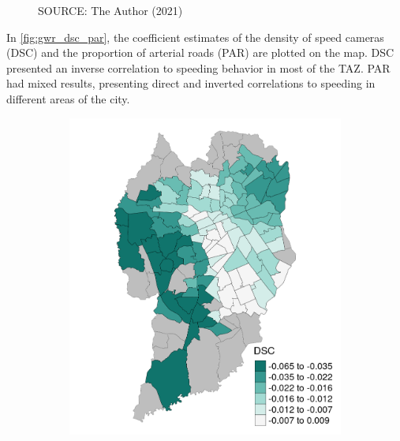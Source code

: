 \begin{figure}[!htbp]
\begin{subfigure}{0.5\textwidth}
    \end{subfigure}    
    \label{fig:sp_mean_sd}
    \par SOURCE: The Author (2021)
\end{figure}


In \autoref{fig:gwr_dsc_par}, the coefficient estimates of the density of speed cameras (DSC) and the proportion of arterial roads (PAR) are plotted on the map. DSC presented an inverse correlation to speeding behavior in most of the TAZ. PAR had mixed results, presenting direct and inverted correlations to speeding in different areas of the city. 


\begin{figure}[!htbp]
    \centering\footnotesize
    \captionsetup{font=footnotesize}
    \caption{DSC AND PAR COEFFICIENT ESTIMATES}
    \begin{subfigure}{0.5\textwidth}
        \includegraphics{fig/DSC.png}
    \end{subfigure}%
    \begin{subfigure}{0.5\textwidth}

\end{subfigure}
\end{figure}
